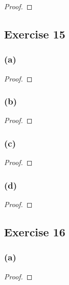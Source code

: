 \documentclass[14pt]{extarticle}
\begin{document}
\begin{proof}

\end{proof}

\subsection{Exercise 15}

\subsubsection{(a)}

\begin{proof}

\end{proof}

\subsubsection{(b)}

\begin{proof}

\end{proof}

\subsubsection{(c)}

\begin{proof}

\end{proof}

\subsubsection{(d)}

\begin{proof}

\end{proof}

\subsection{Exercise 16}

\subsubsection{(a)}

\begin{proof}

\end{proof}
\end{document}
